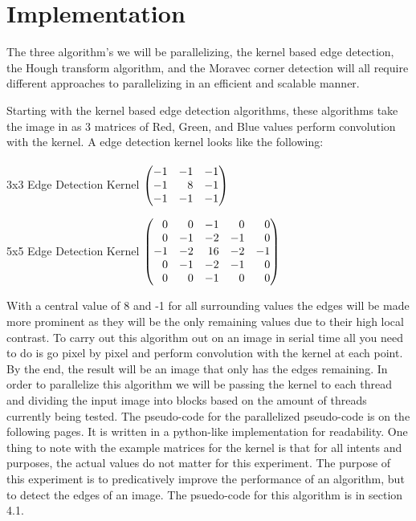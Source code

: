 \documentclass{article}
\begin{document}
    \section{Implementation}
        The three algorithm's we will be parallelizing, the kernel based edge detection, the Hough transform algorithm, and the Moravec corner detection will all require different approaches to parallelizing in an efficient and scalable manner.
        
        Starting with the kernel based edge detection algorithms, these algorithms take the image in as 3 matrices of Red, Green, and Blue values perform convolution with the kernel.  A edge detection kernel looks like the following:\\\\
        
        3x3 Edge Detection Kernel
        $\begin{pmatrix*}[r]
        -1 & -1 & -1\\
        -1 &  8 & -1\\
        -1 & -1 & -1
        \end{pmatrix*}\\\\$
        
        5x5 Edge Detection Kernel
        $\begin{pmatrix*}[r]
        0 &   0 & -1 &  0 &  0\\
        0 &  -1 & -2 & -1 &  0\\
        -1 & -2 & 16 & -2 & -1\\
        0 &  -1 & -2 & -1 &  0\\
        0 &   0 & -1 &  0 &  0
        \end{pmatrix*}\\\\$
        
        With a central value of 8 and -1 for all surrounding values the edges will be made more prominent as they will be the only remaining values due to their high local contrast.  To carry out this algorithm out on an image in serial time all you need to do is go pixel by pixel and perform convolution with the kernel at each point.  By the end, the result will be an image that only has the edges remaining.  In order to parallelize this algorithm we will be passing the kernel to each thread and dividing the input image into blocks based on the amount of threads currently being tested.  The pseudo-code for the parallelized pseudo-code is on the following pages.  It is written in a python-like implementation for readability.  One thing to note with the example matrices for the kernel is that for all intents and purposes, the actual values do not matter for this experiment.  The purpose of this experiment is to predicatively improve the performance of an algorithm, but to detect the edges of an image.  The psuedo-code for this algorithm is in section 4.1.
        
\end{document}
